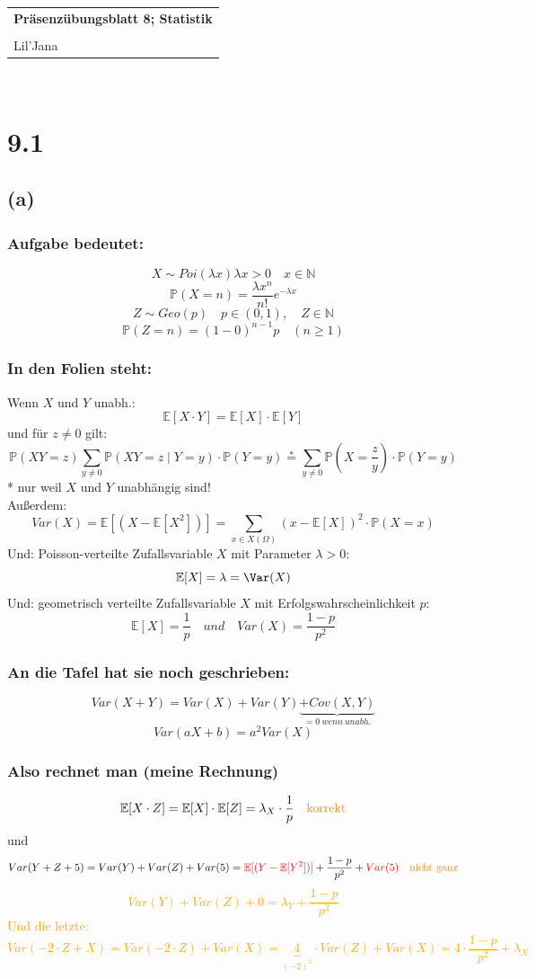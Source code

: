 \documentclass{article} %
\newcommand{\titulo}{Präsenzübungsblatt 8; Statistik}
\newcommand{\nombre}{Lil'Jana}
\newcommand{\p}[0]{\mathbb{P}}
\newcommand{\E}[1]{\mathbb{E}[#1]}
\begin{document}
\begin{tabular}{p{12cm}}
{{\Large\bf\titulo}}\\
\vspace{0.2cm}\\
 {\large\nombre}\\
\end{tabular}
\vspace{0.2cm}\\

\section*{9.1}
\subsection*{(a)}
\subsubsection*{Aufgabe bedeutet:}
\[
X \sim Poi(\lambda x) \lambda x > 0 \quad x \in \mathbb{N}
\]
\[
\p(X=n) = \frac{\lambda x^n}{n!} e^{-\lambda x}
\]
\[
Z \sim Geo(p) \quad p \in (0,1), \quad Z \in \mathbb{N}
\]
\[
\p(Z=n) = (1-0)^{n-1} p \quad (n \geq 1)
\]
\subsubsection*{In den Folien steht:}
Wenn $X$ und $Y$ unabh.: 
\[ 
\E{X \cdot Y} = \E{X} \cdot \E{Y} 
\]
und für $z \neq 0$ gilt: 
\[
\p (XY = z) \sum_{y \neq 0} \p(XY = z \mid Y = y) \cdot \p (Y = y) \overset{*}{=}  \sum_{y \neq 0} \p (X = \frac{z}{y})  \cdot \p (Y = y)
\]
* nur weil $X$ und $Y$ unabhängig sind! \\
Außerdem: 
\[
Var(X) = \E{(X - \E{X^2})} = \sum_{x \in X(\Omega)} (x - \E{X})^2 \cdot \p (X=x)  
\]
Und: Poisson-verteilte Zufallsvariable $X$ mit Parameter $\lambda > 0$:
\[
\E{X} = \lambda = \Var(X)
\]
Und: geometrisch verteilte Zufallsvariable $X$ mit Erfolgswahrscheinlichkeit $p$: 
\[
\E{X} = \frac{1}{p} \quad und \quad Var(X) = \frac{1-p}{p^2}
\]
\subsubsection*{An die Tafel hat sie noch geschrieben:}
\[
Var(X+Y) = Var(X) + Var(Y) \underbrace{ + Cov(X,Y)}_{=0\ wenn\ unabh.}
\]
\[
Var(aX + b) = a^2 Var(X)
\]
\subsubsection*{Also rechnet man (meine Rechnung)}
 \[
 \E{X\cdot Z} = \E{X} \cdot \E{Z} = \lambda_X \cdot \frac{1}{p} \quad \textcolor{orange}{\text{korrekt}}
 \]
 und 
 \[
 Var(Y + Z + 5) = Var(Y) + Var(Z) + Var(5)  = \textcolor{red}{\E{(Y - \E{Y^2})}} + \frac{1-p}{p^2} + \textcolor{red}{Var(5)} \quad \textcolor{orange}{\text{nicht ganz}}
 \]
 \textcolor{orange}{
 \[
 Var(Y) + Var(Z) + 0 = \lambda_Y + \frac{1-p}{p^2} 
 \]
 Und die letzte: 
 \[
 Var(-2\cdot Z + X) = Var(-2\cdot Z) + Var(X) = \underbrace{4}_{(-2)^2} \cdot Var(Z) + Var(X) = 4 \cdot \frac{1-p}{p^2}  + \lambda_X
 \]
 }
\end{document}
